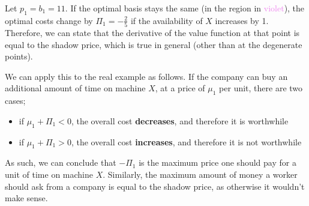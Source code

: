 \documentclass[a4paper, 12pt]{article}
\newcommand{\violet}[1]{\textcolor{violet}{#1}}
\begin{document}
                \begin{center}
                \end{center}
                Let $p_1 = b_1 = 11$.
                If the optimal basis stays the same (in the region in \violet{violet}), the optimal costs change by $\Pi_1 = -\frac{2}{5}$ if the availability of $X$ increases by 1.
                Therefore, we can state that the derivative of the value function at that point is equal to the shadow price, which is true in general (other than at the degenerate points).
                \medskip

                We can apply this to the real example as follows.
                If the company can buy an additional amount of time on machine $X$, at a price of $\mu_1$ per unit, there are two cases;
                \begin{itemize}
                    \itemsep0em
                    \item if $\mu_1 + \Pi_1 < 0$, the overall cost \textbf{decreases}, and therefore it is worthwhile
                    \item if $\mu_1 + \Pi_1 > 0$, the overall cost \textbf{increases}, and therefore it is not worthwhile
                \end{itemize}
                As such, we can conclude that $-\Pi_1$ is the maximum price one should pay for a unit of time on machine $X$.
                Similarly, the maximum amount of money a worker should ask from a company is equal to the shadow price, as otherwise it wouldn't make sense.
                \medskip
\end{document}
